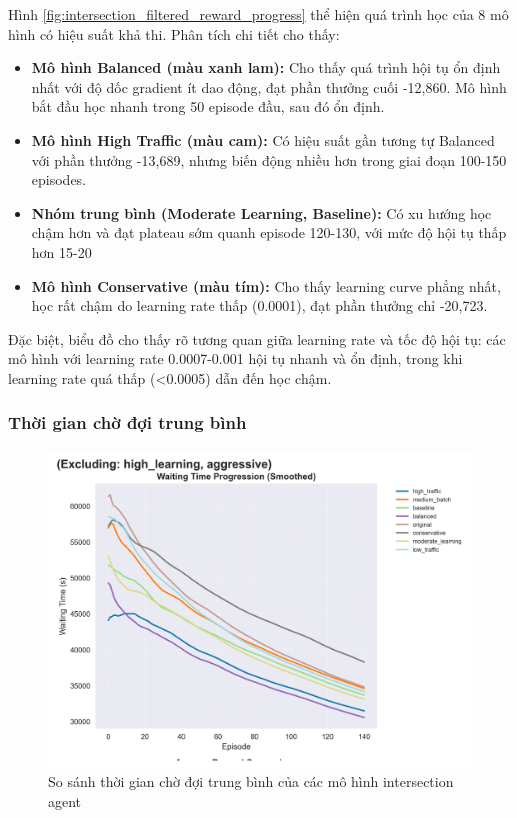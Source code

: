Hình \ref{fig:intersection_filtered_reward_progress} thể hiện quá trình học của 8 mô hình có hiệu suất khả thi. Phân tích chi tiết cho thấy:

\begin{itemize}
    \item \textbf{Mô hình Balanced (màu xanh lam):} Cho thấy quá trình hội tụ ổn định nhất với độ dốc gradient ít dao động, đạt phần thưởng cuối -12,860. Mô hình bắt đầu học nhanh trong 50 episode đầu, sau đó ổn định.
    
    \item \textbf{Mô hình High Traffic (màu cam):} Có hiệu suất gần tương tự Balanced với phần thưởng -13,689, nhưng biến động nhiều hơn trong giai đoạn 100-150 episodes.
    
    \item \textbf{Nhóm trung bình (Moderate Learning, Baseline):} Có xu hướng học chậm hơn và đạt plateau sớm quanh episode 120-130, với mức độ hội tụ thấp hơn 15-20%
    
    \item \textbf{Mô hình Conservative (màu tím):} Cho thấy learning curve phẳng nhất, học rất chậm do learning rate thấp (0.0001), đạt phần thưởng chỉ -20,723.
\end{itemize}

Đặc biệt, biểu đồ cho thấy rõ tương quan giữa learning rate và tốc độ hội tụ: các mô hình với learning rate 0.0007-0.001 hội tụ nhanh và ổn định, trong khi learning rate quá thấp (<0.0005) dẫn đến học chậm.

\subsubsection{Thời gian chờ đợi trung bình}

\begin{figure}[!htp]
    \centering
    \includegraphics[width=\textwidth]{figures/individual_plots/intersection_filtered_waiting_time.png}
    \caption{So sánh thời gian chờ đợi trung bình của các mô hình intersection agent}
    \label{fig:intersection_filtered_waiting_time}
\end{figure}

